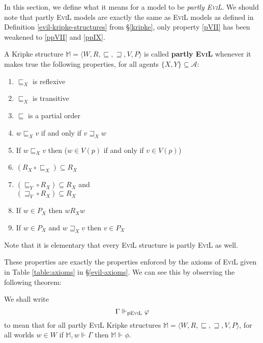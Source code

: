 In this section, we define what it means for a model to be
\emph{partly \textsc{EviL}}.  We should note that partly \textsc{EviL}
models are exactly the same as \textsc{EviL} models as defined in Definition
  \ref{evil-kripke-structures} from \S\ref{kripke}, only property
  \ref{pVII} has been weakened to \ref{ppVII} and \ref{ppIX}.

\begin{definition}\label{partly-evil}
A Kripke structure $\mathbb{M}=\langle W, R, \sqsubseteq, \sqsupseteq, V, P \rangle$ is called \textbf{partly
  \textsc{EviL}} whenever it makes true the following properties, for
all agents $\{X,Y\} \subseteq \mathcal{A}$:
  \begin{enumerate}[label=\textup{(\emph{\Roman*})$'$}, topsep=0.0in, parsep=0.075in]
    \item\label{ppI} $\sqsubseteq_X$ is reflexive
    \item \label{pptrans} $\sqsubseteq_X$ is transitive 
    \item \label{ppantisym} $\sqsubseteq$ is a partial order
    \item \label{ppreverse} $w \sqsubseteq_X v$ if and only if $v
    \sqsupseteq_X w$
    \item \label{islandiff} If $w \sqsubseteq_X v$ then ($w \in V (p)$ if and only if $v
    \in V (p)$)
    \item \label{ppV} $(R_X \circ \sqsubseteq_X) \subseteq R_X$
    \item \label{ppVI} $(\sqsubseteq_Y \circ R_X) \subseteq R_X$ and \\
    $(\sqsupseteq_Y \circ R_X) \subseteq R_X$
    \item\label{ppVII} If $w \in P_X$ then $w
    R_X w$
    \item\label{ppIX} If $w \in P_X$ and $w \sqsupseteq_X v$ then $v
    \in P_X$
  \end{enumerate}
\end{definition}

Note that it is elementary that every \textsc{EviL} structure is
partly \textsc{EviL} as well.

These properties are exactly the properties enforced
by the axioms of \textsc{EviL} given in Table \ref{table:axioms} in
\S\ref{evil-axioms}. We can see this by observing the following
theorem:

\begin{definition}\label{pEviL-Vdash}
We shall write
\[ \Gamma \Vdash_{\textup{p\textsc{EviL}}} \phi \]
to mean that for all partly \textsc{EviL} Kripke structures
$\mathbb{M} = \langle W, R, \sqsubseteq, \sqsupseteq, V, P \rangle$,
for all worlds $w \in W$ if $\mathbb{M},w \Vdash \Gamma$ then $\mathbb{M} \Vdash \phi$.
\end{definition}

